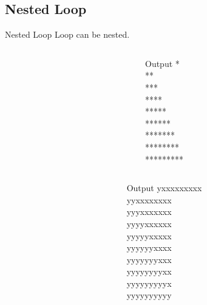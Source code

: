 \documentclass{beamer}
\begin{document}
\subsection[Nested Loop]{Nested Loop}
\begin{frame}{Nested Loop}
    Loop can be nested.
    \begin{columns}
        \begin{column}{0.5\textwidth}
            \begin{example}
                
            \end{example}
        \end{column}
        \begin{column}{0.5\textwidth}  %
            \begin{block}{Output}
                * \\
                ** \\
                *** \\
                **** \\
                ***** \\
                ****** \\
                ******* \\
                ******** \\
                ********* \\
            \end{block}

        \end{column}
    \end{columns}
\end{frame}


\begin{frame}
    \begin{columns}
        \begin{column}{0.5\textwidth}
            \begin{example}
                
            \end{example}
        \end{column}
        \begin{column}{0.5\textwidth}
            \begin{block}{Output}
                yxxxxxxxxx\\
                yyxxxxxxxx\\
                yyyxxxxxxx\\
                yyyyxxxxxx\\
                yyyyyxxxxx\\
                yyyyyyxxxx\\
                yyyyyyyxxx\\
                yyyyyyyyxx\\
                yyyyyyyyyx\\
                yyyyyyyyyy
            \end{block}

        \end{column}
    \end{columns}
\end{frame}
\end{document}
